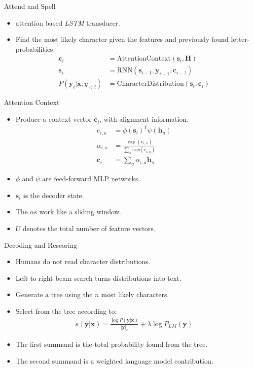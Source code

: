 \documentclass{beamer}
\begin{document}
\begin{frame}{Attend and Spell}
\begin{itemize}
	\item attention based \textit{LSTM} transducer.
	\item Find the most likely character given the features and previously found letter-probabilities.
		  \begin{align}
			\mathbf{c}_i &= \text{AttentionContext}(\mathbf{s}_i,\mathbf{H}) \\
			\mathbf{s}_i &= \text{RNN}(\mathbf{s}_{i-1},\mathbf{y}_{i-1},\mathbf{c}_{i-1}) \\
			P(\mathbf{y}_i|\mathbf{x},y_{<i}) &= \text{CharacterDistribution}(\mathbf{s}_i,\mathbf{c}_{i})
		  \end{align}

\end{itemize}
\end{frame}
\begin{frame}{Attention Context}
	\begin{itemize}
		\item Produce a context vector $\mathbf{c}_i$, with alignment information.
			  \begin{align}
			  	e_{i,u} &= \phi(\mathbf{s}_i)^T \psi(\mathbf{h}_u) \\
			  	\alpha_{i,u} &= \frac{\exp(e_{i,u})}{\sum_u exp(e_{i,u})} \\
			  	\mathbf{c}_i &= \sum\limits_{u} \alpha_{i,u}\mathbf{h}_u 
			  \end{align}
		\item $\phi$ and $\psi$ are feed-forward MLP networks.
		\item $\mathbf{s}_i$ is the decoder state.
		\item The $\alpha$s work like a sliding window.
		\item $U$ denotes the total number of feature vectors.
	\end{itemize}
\end{frame}

\begin{frame}{Decoding and Rescoring}
\begin{itemize}
	\item Humans do not read character distributions.
	\item Left to right beam search turns distributions into text.
	\item Generate a tree using the $n$ most likely characters.
	\item Select from the tree according to:
		\begin{align}
		s(\mathbf{y}|\mathbf{x}) = \frac{\log P(\mathbf{y}|\mathbf{x})}{ |\mathbf{y}|_c} + \lambda \log P_{LM}(\mathbf{y})
		\end{align}
	\item The first summand is the total probability found from the tree. 
	\item The second summand is a weighted language model contribution.
\end{itemize}
\end{frame}
\end{document}
